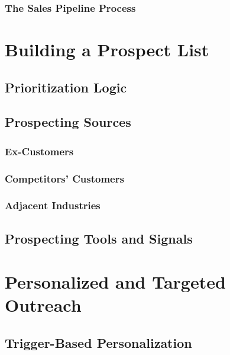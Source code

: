        \subsubsection{The Sales Pipeline Process}\mbox{}

\section{Building a Prospect List}\mbox{}
    \subsection{Prioritization Logic}\mbox{}
    \subsection{Prospecting Sources}\mbox{}
        \subsubsection{Ex-Customers}\mbox{}
        \subsubsection{Competitors' Customers}\mbox{}
        \subsubsection{Adjacent Industries}\mbox{}
    \subsection{Prospecting Tools and Signals}\mbox{}

\section{Personalized and Targeted Outreach}\mbox{}
    \subsection{Trigger-Based Personalization}\mbox{}
